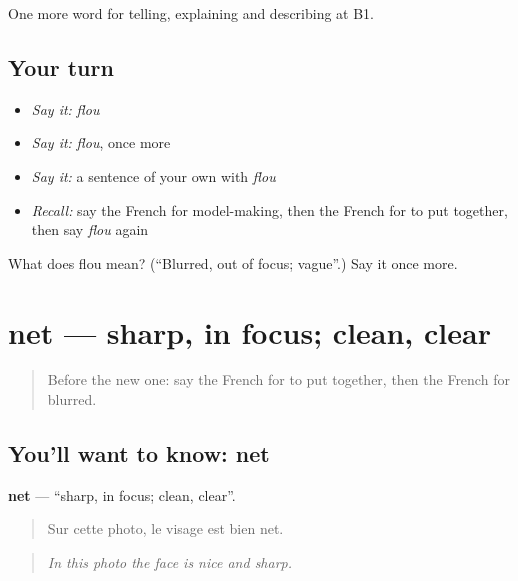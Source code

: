 \begin{grammarlens}[title={What you've built}]
One more word for telling, explaining and describing at B1.
\end{grammarlens}

\subsection*{Your turn}
\begin{itemize}
\raggedright
  \item \emph{Say it:} \emph{flou}
  \item \emph{Say it:} \emph{flou}, once more
  \item \emph{Say it:} a sentence of your own with \emph{flou}
  \item \emph{Recall:} say the French for model-making, then the French for to put together, then say \emph{flou} again
\end{itemize}

\begin{tcolorbox}[breakable,colback=teal!4,colframe=teal!35!black,title={Before you move on}]
What does flou mean? (\textquotedblleft{}Blurred, out of focus; vague\textquotedblright{}.) Say it once more.
\end{tcolorbox}
\section[net]{net — sharp, in focus; clean, clear}

\label{lesson:FR-C502-net}



\begin{quote}
Before the new one: say the French for to put together, then the French for blurred.
\end{quote}

\subsection*{You'll want to know: net}
\textbf{net} — \textquotedblleft{}sharp, in focus; clean, clear\textquotedblright{}.

\begin{quote}
Sur cette photo, le visage est bien net.
\end{quote}

\begin{quote}
\emph{In this photo the face is nice and sharp.}
\end{quote}

